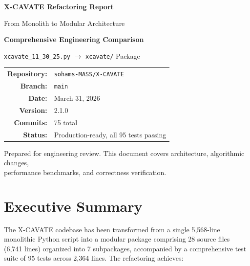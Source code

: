\documentclass[11pt,a4paper]{article}
\newcommand{\original}{\texttt{xcavate\_11\_30\_25.py}}
\newcommand{\refactored}{\texttt{xcavate/}}
\begin{document}
\begin{titlepage}
\centering
\vspace*{2cm}
{\Huge\bfseries\color{accentblue} X-CAVATE Refactoring Report\par}
\vspace{0.5cm}
{\Large\color{accentblue!70!black} From Monolith to Modular Architecture\par}
\vspace{2cm}
{\large\bfseries Comprehensive Engineering Comparison\par}
\vspace{0.3cm}
{\large \original{} $\longrightarrow$ \refactored{} Package\par}
\vspace{3cm}
\begin{tabular}{rl}
\textbf{Repository:} & \texttt{sohams-MASS/X-CAVATE} \\
\textbf{Branch:} & \texttt{main} \\
\textbf{Date:} & March 31, 2026 \\
\textbf{Version:} & 2.1.0 \\
\textbf{Commits:} & 75 total \\
\textbf{Status:} & Production-ready, all 95 tests passing \\
\end{tabular}
\vfill
{\small Prepared for engineering review. This document covers architecture, algorithmic changes,\\performance benchmarks, and correctness verification.\par}
\end{titlepage}

\tableofcontents
\newpage

\section{Executive Summary}

The X-CAVATE codebase has been transformed from a single 5,568-line monolithic Python script into a modular package comprising 28 source files (6,741 lines) organized into 7 subpackages, accompanied by a comprehensive test suite of 95 tests across 2,364 lines. The refactoring achieves:
\end{document}
